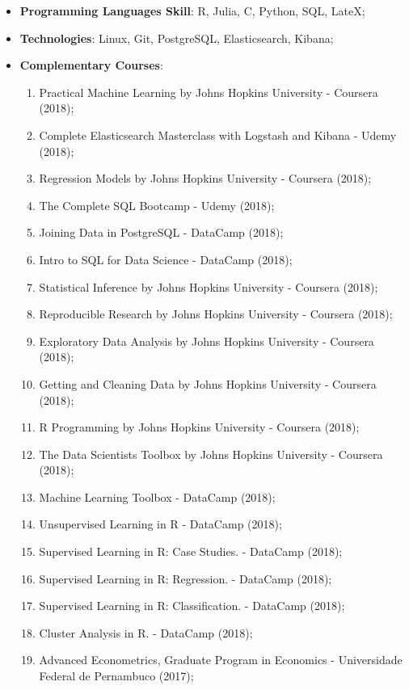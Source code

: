 \documentclass[11pt, a4paper]{awesome-cv}
\providecommand{\tightlist}{%
	\setlength{\itemsep}{0pt}\setlength{\parskip}{0pt}}
\begin{document}
\begin{itemize}
\tightlist
\item
  \textbf{Programming Languages Skill}: R, Julia, C, Python, SQL, LateX;
\item
  \textbf{Technologies}: Linux, Git, PostgreSQL, Elasticsearch, Kibana;
\item
  \textbf{Complementary Courses}:

  \begin{enumerate}
  \def\labelenumi{\arabic{enumi}.}
  \tightlist
  \item
    Practical Machine Learning by Johns Hopkins University - Coursera (2018);
  \item
    Complete Elasticsearch Masterclass with Logstash and Kibana - Udemy (2018);
  \item
    Regression Models by Johns Hopkins University - Coursera (2018);
  \item
    The Complete SQL Bootcamp - Udemy (2018);
  \item
    Joining Data in PostgreSQL - DataCamp (2018);
  \item
    Intro to SQL for Data Science - DataCamp (2018);
  \item
    Statistical Inference by Johns Hopkins University - Coursera (2018);
  \item
    Reproducible Research by Johns Hopkins University - Coursera (2018);
  \item
    Exploratory Data Analysis by Johns Hopkins University - Coursera (2018);
  \item
    Getting and Cleaning Data by Johns Hopkins University - Coursera (2018);
  \item
    R Programming by Johns Hopkins University - Coursera (2018);
  \item
    The Data Scientists Toolbox by Johns Hopkins University - Coursera (2018);
  \item
    Machine Learning Toolbox - DataCamp (2018);
  \item
    Unsupervised Learning in R - DataCamp (2018);
  \item
    Supervised Learning in R: Case Studies. - DataCamp (2018);
  \item
    Supervised Learning in R: Regression. - DataCamp (2018);
  \item
    Supervised Learning in R: Classification. - DataCamp (2018);
  \item
    Cluster Analysis in R. - DataCamp (2018);
  \item
    Advanced Econometrics, Graduate Program in Economics - Universidade Federal de Pernambuco (2017);

\end{enumerate}
\end{itemize}
\end{document}
